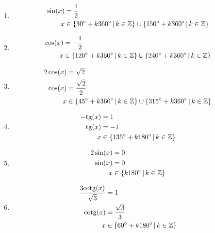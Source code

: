 \documentclass[11pt,a4paper]{article}
\begin{document}
			\begin{enumerate}
				
				\item 
				\begin{align*}
					\sin(x) &= \frac 12
				\\
					x &\in \left\{ 30\degree + k360\degree \, | \, k \in {\mathbb Z} \right\} \cup \left\{ 150\degree + k360\degree \, | \, k \in {\mathbb Z} \right\}
				\end{align*}
				
				\item 
				\begin{align*}
					\cos(x) &= -\frac 12
				\\
					x & \in \left\{ 120\degree + k360\degree \, | \, k \in {\mathbb Z} \right\} \cup \left\{ 240\degree + k360\degree \, | \, k \in {\mathbb Z} \right\}
				\end{align*}
				
				\item 
				\begin{align*}
					2\cos(x) &= \sqrt 2
				\\
					\cos(x) &= \frac{\sqrt 2}{2}
				\\
					x &\in \left\{ 45\degree + k360\degree \, | \, k \in {\mathbb Z} \right\} \cup \left\{ 315\degree + k360\degree \, | \, k \in {\mathbb Z} \right\}
				\end{align*}
				
				\item 
				\begin{align*}
					-\mathrm{tg}(x) &= 1
				\\
					\mathrm{tg}(x) &= -1
				\\
					x &\in \left\{ 135\degree + k180\degree \, | \, k \in {\mathbb Z} \right\}
				\end{align*}
				
				\item 
				\begin{align*}
					2\sin(x) &= 0
				\\
					\sin(x) &= 0
				\\
					x &\in \left\{ k180\degree \, | \, k \in {\mathbb Z} \right\}
				\end{align*}
				
				\item 
				\begin{align*}
					\frac{3 \mathrm{cotg}(x)}{\sqrt 3} &= 1
				\\
					\mathrm{cotg}(x) &= \frac{\sqrt 3}{3}
				\\
					x &\in \left\{ 60\degree + k180\degree \, | \, k \in {\mathbb Z} \right\}
				\end{align*}
				
			\end{enumerate}
	
	
\end{document}
